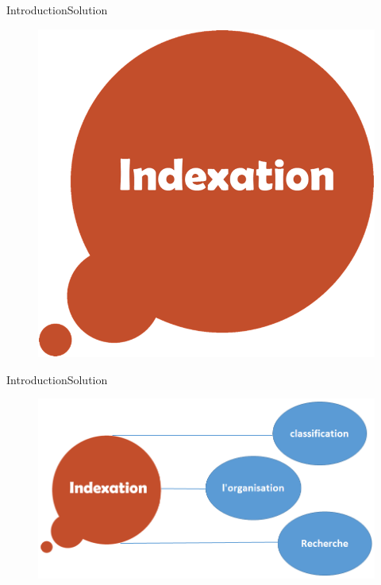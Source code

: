 \documentclass[10pt]{beamer}
\begin{document}
\begin{frame}{Introduction}{Solution}
\begin{figure}[t]
    \centering
    \includegraphics[height=\dimexpr10\textheight/16\relax]{22}
   
  \end{figure}
\end{frame}



\begin{frame}{Introduction}{Solution}
\begin{figure}[t]
    \centering
    \includegraphics[height=\dimexpr10\textheight/16\relax]{Untitled}
  
  \end{figure}
\end{frame}
\end{document}
